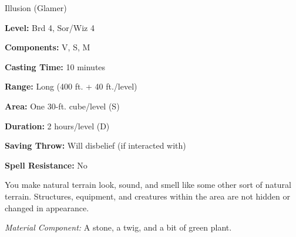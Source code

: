 
Illusion (Glamer)

\textbf{Level:} Brd 4, Sor/Wiz 4

\textbf{Components:} V, S, M

\textbf{Casting Time:} 10 minutes

\textbf{Range:} Long (400 ft. + 40 ft./level)

\textbf{Area:} One 30-ft. cube/level (S)

\textbf{Duration:} 2 hours/level (D)

\textbf{Saving Throw:} Will disbelief (if interacted with)

\textbf{Spell Resistance:} No

You make natural terrain look, sound, and smell like some other sort of natural 
terrain. Structures, equipment, and creatures within the area are not hidden or 
changed in appearance.

\textit{Material Component:} A stone, a twig, and a bit of green plant.

